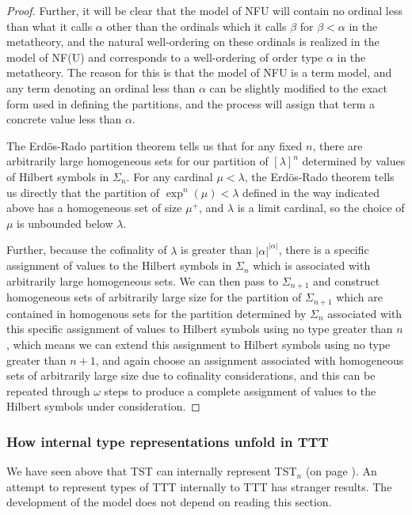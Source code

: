 \documentclass[112pt]{article}
\theoremstyle{definition}
\theoremstyle{remark}
\begin{document}
\begin{proof}
Further, it will be clear that the model of NFU will contain no ordinal less than what it calls $\alpha$ other than the ordinals which it calls $\beta$ for $\beta<\alpha$ in the metatheory, and the natural well-ordering on these ordinals is realized in the model of NF(U) and corresponds to a well-ordering of order type $\alpha$ in the metatheory.  The reason for this is that the model of NFU is a term model, and any term denoting an ordinal less than $\alpha$ can be slightly modified to the exact form used in defining the partitions, and the process will assign that term a concrete value less than $\alpha$.

The Erd\"os-Rado partition theorem tells us that for any fixed $n$, there are arbitrarily large homogeneous sets
for our partition of $[\lambda]^n$ determined by values of Hilbert symbols in $\Sigma_n$.  For any cardinal $\mu<\lambda$,
the Erd\"os-Rado theorem tells us directly that the partition of $\exp^n(\mu)<\lambda$ defined in the way indicated above
has a homogeneous set of size $\mu^+$, and $\lambda$ is a limit cardinal, so the choice of $\mu$ is unbounded below $\lambda$.

Further, because the cofinality of $\lambda$ is greater than $|\alpha|^{|\alpha|}$,
there is a specific assignment of values to the Hilbert symbols in $\Sigma_n$ which is associated with arbitrarily large homogeneous sets.  We can then pass to $\Sigma_{n+1}$ and construct homogeneous sets of arbitrarily large size for
the partition of $\Sigma_{n+1}$ which are contained in homogenous sets for the partition determined by $\Sigma_{n}$ associated
with this specific assignment of values to Hilbert symbols using no type greater than $n$, which means we can extend
this assignment to Hilbert symbols using no type greater than $n+1$, and again choose an assignment associated with homogeneous sets of arbitrarily large size due to cofinality considerations, and this can be repeated through $\omega$ steps to produce a complete assignment of values to the Hilbert symbols under consideration.

\newpage

\end{proof}

\subsubsection{How internal type representations unfold in TTT}

We have seen above that TST can internally represent TST$_n$ (on page \pageref{tstnmodel}).   An attempt to represent types of TTT internally to TTT has stranger results.  The development of the model does not depend on reading this section.
\end{document}
